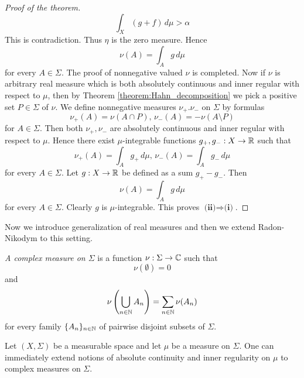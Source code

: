 \begin{proof}[Proof of the theorem]
    $$\int_X\left(g + f\right)\,d\mu > \alpha$$
    This is contradiction. Thus $\eta$ is the zero measure. Hence
    $$\nu(A) = \int_Ag\,d\mu$$
    for every $A \in \Sigma$. The proof of nonnegative valued $\nu$ is completed. Now if $\nu$ is arbitrary real measure which is both absolutely continuous and inner regular with respect to $\mu$, then by Theorem \ref{theorem:Hahn_decomposition} we pick a positive set $P \in \Sigma$ of $\nu$. We define nonnegative measures $\nu_+.\nu_-$ on $\Sigma$ by formulas
    $$\nu_+(A) = \nu(A\cap P),\,\nu_-(A) = -\nu(A\setminus P)$$
    for $A \in \Sigma$. Then both $\nu_+,\nu_-$ are absolutely continuous and inner regular with respect to $\mu$. Hence there exist $\mu$-integrable functions $g_+,g_-:X\rightarrow {\mathbb R}$ such that
    $$\nu_+(A) = \int_Ag_+\,d\mu,\,\nu_-(A) = \int_Ag_-\,d\mu$$
    for every $A \in \Sigma$. Let $g:X\rightarrow {\mathbb R}$ be defined as a sum $g_+ - g_-$. Then
    $$\nu(A) = \int_Ag\,d\mu$$
    for every $A \in \Sigma$. Clearly $g$ is $\mu$-integrable. This proves $\textbf{(ii)}\Rightarrow \textbf{(i)}$.
\end{proof}
\noindent
Now we introduce generalization of real measures and then we extend Radon-Nikodym to this setting.

\begin{definition}
    \textit{A complex measure on $\Sigma$} is a function $\nu:\Sigma\rightarrow {\mathbb C}$ such that $$\nu(\emptyset)=0$$
    and
    $$\nu\left(\bigcup_{n\in {\mathbb N}}A_n\right)=\sum_{n\in {\mathbb N}}\nu(A_n)$$
    for every family $\{A_n\}_{n\in {\mathbb N}}$ of pairwise disjoint subsets of $\Sigma$.
\end{definition}

\begin{remark}\label{remark:absolute_continuity_and_inner_regularity_can_be_extended_to_complex_measures}
    Let $(X,\Sigma)$ be a measurable space and let $\mu$ be a measure on $\Sigma$. One can immediately extend notions of absolute continuity and inner regularity on $\mu$ to complex measures on $\Sigma$.
\end{remark}

